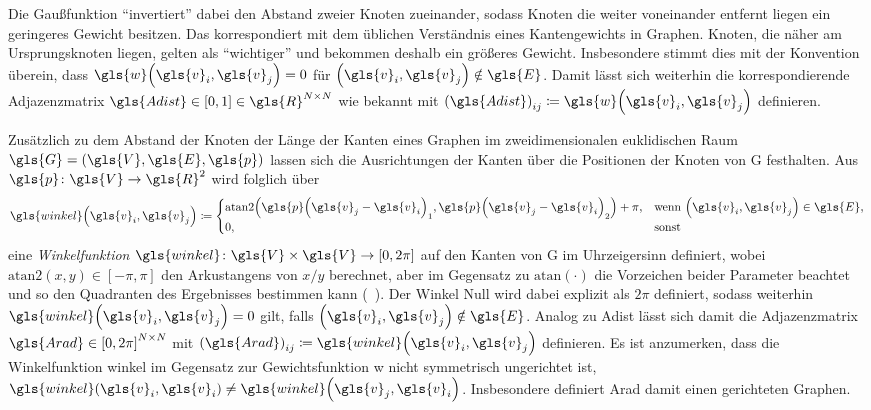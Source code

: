 Die Gaußfunktion \enquote{invertiert} dabei den Abstand zweier Knoten zueinander, sodass Knoten die weiter voneinander entfernt liegen ein geringeres Gewicht besitzen.
Das korrespondiert mit dem üblichen Verständnis eines Kantengewichts in Graphen.
Knoten, die näher am Ursprungsknoten liegen, gelten als \enquote{wichtiger} und bekommen deshalb ein größeres Gewicht.
Insbesondere stimmt dies mit der Konvention überein, dass $\gls{w}\left(\gls{v}_i, \gls{v}_j\right) = 0$ für $\left(\gls{v}_i, \gls{v}_j\right) \notin \gls{E}$.
Damit lässt sich weiterhin die korrespondierende Adjazenzmatrix $\gls{Adist} \in \left[0, 1\right] \in \gls{R}^{N \times N}$ wie bekannt mit ${\left(\gls{Adist}\right)}_{ij} \coloneqq \gls{w}\left(\gls{v}_i, \gls{v}_j\right)$ definieren.

Zusätzlich zu dem Abstand der Knoten \bzw{} der Länge der Kanten eines Graphen im zweidimensionalen euklidischen Raum $\gls{G} = \left(\gls{V}, \gls{E}, \gls{p}\right)$ lassen sich die Ausrichtungen der Kanten über die Positionen der Knoten von \gls{G} festhalten.
Aus $\gls{p} \colon \gls{V} \to \gls{R}^2$ wird folglich über
\begin{equation*}
  \gls{winkel}\left(\gls{v}_i, \gls{v}_j\right) \coloneqq \begin{cases}
    \mathrm{atan2}\left({\gls{p}\left(\gls{v}_j - \gls{v}_i\right)}_1, {\gls{p}\left(\gls{v}_j - \gls{v}_i\right)}_2\right) + \pi, & \text{wenn }\left(\gls{v}_i, \gls{v}_j\right) \in \gls{E},\\
    0, & \text{sonst}
  \end{cases}
\end{equation*}
eine \emph{Winkelfunktion} $\gls{winkel} \colon \gls{V} \times \gls{V} \to \left[0, 2\pi\right]$ auf den Kanten von \gls{G} im Uhrzeigersinn definiert, wobei $\mathrm{atan2}\left(x, y\right) \in \left[-\pi, \pi\right]$ den Arkustangens von $x/y$ berechnet, aber im Gegensatz zu $\mathrm{atan}\left(\cdot\right)$ die Vorzeichen beider Parameter beachtet und so den Quadranten des Ergebnisses bestimmen kann (\vgl{}~\cite{atan2}).
Der Winkel Null wird dabei explizit als $2\pi$ definiert, sodass weiterhin $\gls{winkel}\left(\gls{v}_i, \gls{v}_j\right) = 0$ gilt, falls $\left(\gls{v}_i, \gls{v}_j\right) \notin \gls{E}$.
Analog zu \gls{Adist} lässt sich damit die Adjazenzmatrix $\gls{Arad} \in {\left[0, 2\pi\right]}^{N \times N}$ mit ${\left(\gls{Arad}\right)}_{ij} \coloneqq \gls{winkel}\left(\gls{v}_i, \gls{v}_j\right)$ definieren.
Es ist anzumerken, dass die Winkelfunktion \gls{winkel} im Gegensatz zur Gewichtsfunktion \gls{w} nicht symmetrisch \bzw{} ungerichtet ist, \dhe{} $\gls{winkel}\left(\gls{v}_i, \gls{v}_i\right) \neq \gls{winkel}\left(\gls{v}_j, \gls{v}_i\right)$.
Insbesondere definiert \gls{Arad} damit einen gerichteten Graphen.

